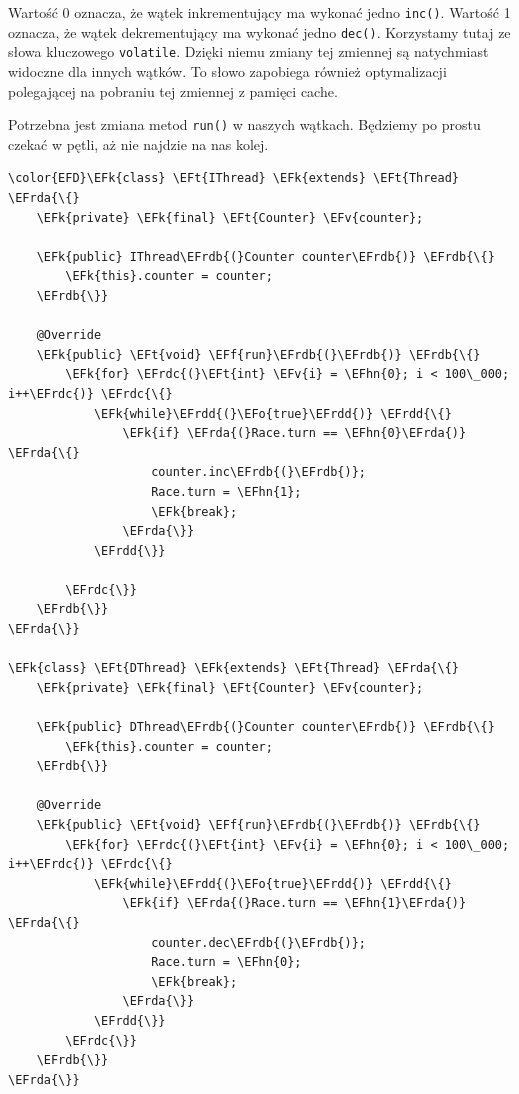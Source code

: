 \documentclass[11pt]{article}
\newcommand{\EFk}[1]{\textbf{#1}} %
\newcommand{\EFf}[1]{\textbf{#1}} %
\newcommand{\EFv}[1]{#1} %
\newcommand{\EFt}[1]{\textbf{#1}} %
\newcommand{\EFo}[1]{#1} %
\newcommand{\EFhn}[1]{\textcolor{EFhn}{\textbf{#1}}} %
\newcommand{\EFrda}[1]{\textcolor{EFrda}{#1}} %
\newcommand{\EFrdb}[1]{\textcolor{EFrdb}{#1}} %
\newcommand{\EFrdc}[1]{\textcolor{EFrdc}{#1}} %
\newcommand{\EFrdd}[1]{\textcolor{EFrdd}{#1}} %
\begin{document}
Wartość 0 oznacza, że wątek inkrementujący ma wykonać jedno \texttt{inc()}.
Wartość 1 oznacza, że wątek dekrementujący ma wykonać jedno \texttt{dec()}.
Korzystamy tutaj ze słowa kluczowego \texttt{volatile}. Dzięki niemu zmiany tej zmiennej są
natychmiast widoczne dla innych wątków. To słowo zapobiega również optymalizacji
polegającej na pobraniu tej zmiennej z pamięci cache.

Potrzebna jest zmiana metod \texttt{run()} w naszych wątkach. Będziemy po prostu czekać w
pętli, aż nie najdzie na nas kolej.

\begin{Code}
\begin{Verbatim}
\color{EFD}\EFk{class} \EFt{IThread} \EFk{extends} \EFt{Thread} \EFrda{\{}
    \EFk{private} \EFk{final} \EFt{Counter} \EFv{counter};

    \EFk{public} IThread\EFrdb{(}Counter counter\EFrdb{)} \EFrdb{\{}
        \EFk{this}.counter = counter;
    \EFrdb{\}}

    @Override
    \EFk{public} \EFt{void} \EFf{run}\EFrdb{(}\EFrdb{)} \EFrdb{\{}
        \EFk{for} \EFrdc{(}\EFt{int} \EFv{i} = \EFhn{0}; i < 100\_000; i++\EFrdc{)} \EFrdc{\{}
            \EFk{while}\EFrdd{(}\EFo{true}\EFrdd{)} \EFrdd{\{}
                \EFk{if} \EFrda{(}Race.turn == \EFhn{0}\EFrda{)} \EFrda{\{}
                    counter.inc\EFrdb{(}\EFrdb{)};
                    Race.turn = \EFhn{1};
                    \EFk{break};
                \EFrda{\}}
            \EFrdd{\}}

        \EFrdc{\}}
    \EFrdb{\}}
\EFrda{\}}

\EFk{class} \EFt{DThread} \EFk{extends} \EFt{Thread} \EFrda{\{}
    \EFk{private} \EFk{final} \EFt{Counter} \EFv{counter};

    \EFk{public} DThread\EFrdb{(}Counter counter\EFrdb{)} \EFrdb{\{}
        \EFk{this}.counter = counter;
    \EFrdb{\}}

    @Override
    \EFk{public} \EFt{void} \EFf{run}\EFrdb{(}\EFrdb{)} \EFrdb{\{}
        \EFk{for} \EFrdc{(}\EFt{int} \EFv{i} = \EFhn{0}; i < 100\_000; i++\EFrdc{)} \EFrdc{\{}
            \EFk{while}\EFrdd{(}\EFo{true}\EFrdd{)} \EFrdd{\{}
                \EFk{if} \EFrda{(}Race.turn == \EFhn{1}\EFrda{)} \EFrda{\{}
                    counter.dec\EFrdb{(}\EFrdb{)};
                    Race.turn = \EFhn{0};
                    \EFk{break};
                \EFrda{\}}
            \EFrdd{\}}
        \EFrdc{\}}
    \EFrdb{\}}
\EFrda{\}}
\end{Verbatim}
\end{Code}
\end{document}
